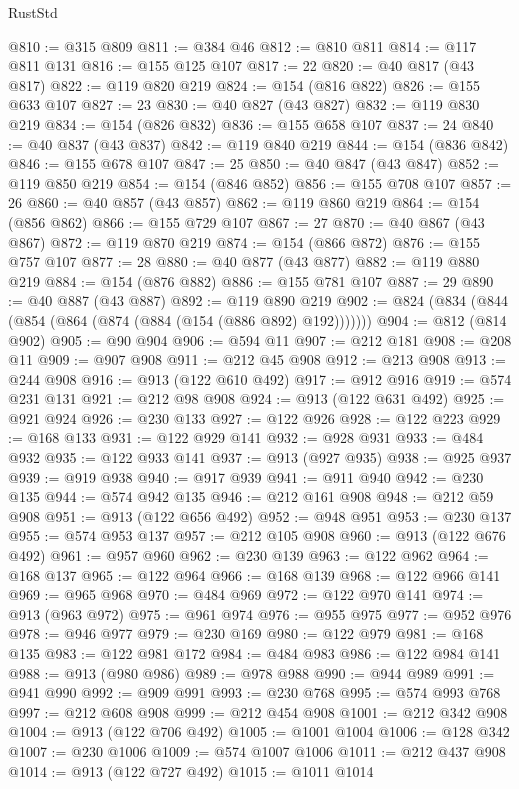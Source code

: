 \begin{lexlean}{RustStd}
\begin{coremodule}
@810 := @315 @809
@811 := @384 @46
@812 := @810 @811
@814 := @117 @811 @131
@816 := @155 @125 @107
@817 := 22
@820 := @40 @817 (@43 @817)
@822 := @119 @820 @219
@824 := @154 (@816 @822)
@826 := @155 @633 @107
@827 := 23
@830 := @40 @827 (@43 @827)
@832 := @119 @830 @219
@834 := @154 (@826 @832)
@836 := @155 @658 @107
@837 := 24
@840 := @40 @837 (@43 @837)
@842 := @119 @840 @219
@844 := @154 (@836 @842)
@846 := @155 @678 @107
@847 := 25
@850 := @40 @847 (@43 @847)
@852 := @119 @850 @219
@854 := @154 (@846 @852)
@856 := @155 @708 @107
@857 := 26
@860 := @40 @857 (@43 @857)
@862 := @119 @860 @219
@864 := @154 (@856 @862)
@866 := @155 @729 @107
@867 := 27
@870 := @40 @867 (@43 @867)
@872 := @119 @870 @219
@874 := @154 (@866 @872)
@876 := @155 @757 @107
@877 := 28
@880 := @40 @877 (@43 @877)
@882 := @119 @880 @219
@884 := @154 (@876 @882)
@886 := @155 @781 @107
@887 := 29
@890 := @40 @887 (@43 @887)
@892 := @119 @890 @219
@902 := @824 (@834 (@844 (@854 (@864 (@874 (@884 (@154 (@886 @892) @192)))))))
@904 := @812 (@814 @902)
@905 := @90 @904
@906 := @594 @11
@907 := @212 @181
@908 := @208 @11
@909 := @907 @908
@911 := @212 @45 @908
@912 := @213 @908
@913 := @244 @908
@916 := @913 (@122 @610 @492)
@917 := @912 @916
@919 := @574 @231 @131
@921 := @212 @98 @908
@924 := @913 (@122 @631 @492)
@925 := @921 @924
@926 := @230 @133
@927 := @122 @926
@928 := @122 @223
@929 := @168 @133
@931 := @122 @929 @141
@932 := @928 @931
@933 := @484 @932
@935 := @122 @933 @141
@937 := @913 (@927 @935)
@938 := @925 @937
@939 := @919 @938
@940 := @917 @939
@941 := @911 @940
@942 := @230 @135
@944 := @574 @942 @135
@946 := @212 @161 @908
@948 := @212 @59 @908
@951 := @913 (@122 @656 @492)
@952 := @948 @951
@953 := @230 @137
@955 := @574 @953 @137
@957 := @212 @105 @908
@960 := @913 (@122 @676 @492)
@961 := @957 @960
@962 := @230 @139
@963 := @122 @962
@964 := @168 @137
@965 := @122 @964
@966 := @168 @139
@968 := @122 @966 @141
@969 := @965 @968
@970 := @484 @969
@972 := @122 @970 @141
@974 := @913 (@963 @972)
@975 := @961 @974
@976 := @955 @975
@977 := @952 @976
@978 := @946 @977
@979 := @230 @169
@980 := @122 @979
@981 := @168 @135
@983 := @122 @981 @172
@984 := @484 @983
@986 := @122 @984 @141
@988 := @913 (@980 @986)
@989 := @978 @988
@990 := @944 @989
@991 := @941 @990
@992 := @909 @991
@993 := @230 @768
@995 := @574 @993 @768
@997 := @212 @608 @908
@999 := @212 @454 @908
@1001 := @212 @342 @908
@1004 := @913 (@122 @706 @492)
@1005 := @1001 @1004
@1006 := @128 @342
@1007 := @230 @1006
@1009 := @574 @1007 @1006
@1011 := @212 @437 @908
@1014 := @913 (@122 @727 @492)
@1015 := @1011 @1014

\end{coremodule}
\end{lexlean}
